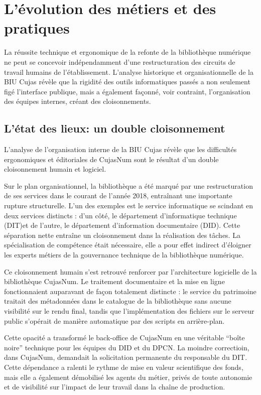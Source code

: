 \section{L'évolution des métiers et des pratiques}
La réussite technique et ergonomique de la refonte de la bibliothèque numérique ne peut se concevoir indépendamment d'une restructuration des circuits de travail humains de l'établissement. L'analyse historique et organisationnelle de la BIU Cujas révèle que la rigidité des outils informatiques passés a non seulement figé l'interface publique, mais a également façonné, voir contraint, l'organisation des équipes internes, créant des cloisonnements.

\subsection{L'état des lieux: un double cloisonnement}
L'analyse de l'organisation interne de la BIU Cujas révèle que les difficultés ergonomiques et éditoriales de CujasNum sont le résultat d'un double cloisonnement humain et logiciel.

Sur le plan organisationnel, la bibliothèque a été marqué par une restructuration de ses services dans le courant de l'année 2018, entraînant une importante rupture structurelle. L'un des exemples est le service informatique se scindant en deux services distincts : d'un côté, le département d'informatique technique (DIT)et de l'autre, le département d'information documentaire (DID). Cette séparation nette entraîne un cloisonnement dans la réalisation des tâches. La spécialisation de compétence était nécessaire, elle a pour effet indirect d'éloigner les experts métiers de la gouvernance technique de la bibliothèque numérique.

Ce cloisonnement humain s'est retrouvé renforcer par l'architecture logicielle de la bibliothèque CujasNum. Le traitement documentaire et la mise en ligne fonctionnaient auparavant de façon totalement distincte : le service du patrimoine traitait des métadonnées dans le catalogue de la bibliothèque sans aucune visibilité sur le rendu final, tandis que l'implémentation des fichiers sur le serveur public s'opérait de manière automatique par des scripts en arrière-plan.

Cette opacité a transformé le back-office de CujasNum en une véritable \enquote{boîte noire} technique pour les équipes du DID et du DPCN. La moindre correctioin, dans CujasNum, demandait la solicitation permanente du responsable du DIT. Cette dépendance a ralenti le rythme de mise en valeur scientifique des fonds, mais elle a également démobilisé les agents du métier, privés de toute autonomie et de visibilité sur l'impact de leur travail dans la chaîne de production.

